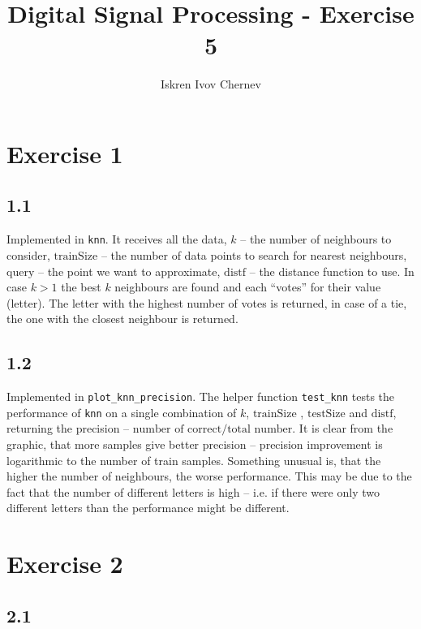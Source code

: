 \documentclass[a4paper]{article}
\begin{document}
\title{Digital Signal Processing - Exercise 5}
\author{Iskren Ivov Chernev}
\maketitle

\section*{Exercise 1}

\subsection*{1.1}

Implemented in \texttt{knn}. It receives all the data, $ k $ -- the number of
neighbours to consider, $ \mathrm{trainSize} $ -- the number of data points to
search for nearest neighbours, $ \mathrm{query} $ -- the point we want to
approximate, $ \mathrm{distf} $ -- the distance function to use. In case
$ k > 1 $ the best $ k $ neighbours are found and each ``votes'' for their
value (letter). The letter with the highest number of votes is returned, in
case of a tie, the one with the closest neighbour is returned.

\subsection*{1.2}

Implemented in \texttt{plot\_knn\_precision}. The helper function
\texttt{test\_knn} tests the performance of \texttt{knn} on a single
combination of $ k $, $ \mathrm{trainSize}$ , $ \mathrm{testSize} $ and
$ \mathrm{distf} $, returning the precision -- $ \text{number of correct}
/ \text{total number} $. It is clear from the graphic, that more samples give
better precision -- precision improvement is logarithmic to the number of train
samples. Something unusual is, that the higher the number of neighbours, the
worse performance. This may be due to the fact that the number of different
letters is high -- i.e. if there were only two different letters than the
performance might be different.

\section*{Exercise 2}

\subsection*{2.1}
\end{document}
